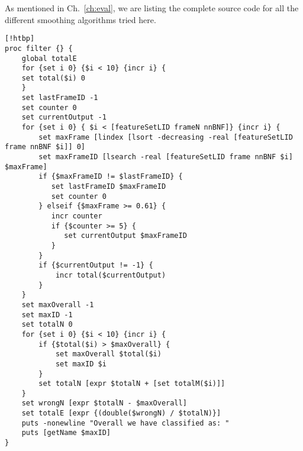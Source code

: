 As mentioned in Ch.~\ref{ch:eval}, we are listing the complete source code for all the different smoothing algorithms tried here.

\begin{lstlisting}[label=lst:BasicFilter,caption=Basic (first try) Filter employed to smooth/improve output][!htbp]
proc filter {} {
    global totalE
    for {set i 0} {$i < 10} {incr i} {
    set total($i) 0
    }
    set lastFrameID -1
    set counter 0
    set currentOutput -1
    for {set i 0} { $i < [featureSetLID frameN nnBNF]} {incr i} {
        set maxFrame [lindex [lsort -decreasing -real [featureSetLID frame nnBNF $i]] 0]
        set maxFrameID [lsearch -real [featureSetLID frame nnBNF $i] $maxFrame]
        if {$maxFrameID != $lastFrameID} {
           set lastFrameID $maxFrameID
           set counter 0
        } elseif {$maxFrame >= 0.61} {
           incr counter
           if {$counter >= 5} {
              set currentOutput $maxFrameID
           }
        }
        if {$currentOutput != -1} {
            incr total($currentOutput)
        }
    }
    set maxOverall -1
    set maxID -1
    set totalN 0
    for {set i 0} {$i < 10} {incr i} {
        if {$total($i) > $maxOverall} {
            set maxOverall $total($i)
            set maxID $i
        }
        set totalN [expr $totalN + [set totalM($i)]]
    }
    set wrongN [expr $totalN - $maxOverall]
    set totalE [expr {(double($wrongN) / $totalN)}]
    puts -nonewline "Overall we have classified as: "
    puts [getName $maxID]
}
\end{lstlisting}

